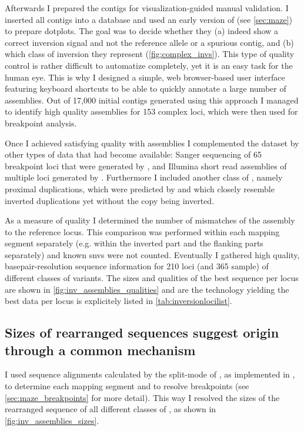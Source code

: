 Afterwards I prepared the contigs for visualization-guided manual validation. I
inserted all contigs into a database and used an early version of \maze (see
\cref{sec:maze}) to prepare dotplots. The goal was to decide whether they (a)
indeed show a correct inversion signal and not the reference allele or a
spurious contig, and (b) which class of inversion they represent
(\cref{fig:complex_invs}). This type of quality control is rather difficult to
automatize completely, yet it is an easy task for the human eye. This is why I
designed a simple, web browser-based user interface featuring keyboard shortcuts
to be able to quickly annotate a large number of assemblies. Out of 17,000
initial contigs generated using this approach I managed to identify high quality
assemblies for 153 complex loci, which were then used for breakpoint analysis.

Once I achieved satisfying quality with \pacbio assemblies I complemented the
dataset by other types of data that had become available: Sanger sequencing of
65 breakpoint loci that were generated by \adrian, and Illumina short read
assemblies of multiple loci generated by \tobias. Furthermore I included another
class of \sv, namely proximal duplications, which were predicted by \tobias and
which closely resemble inverted duplications yet without the copy being
inverted.

As a measure of quality I determined the number of mismatches of the assembly to
the reference locus. This comparison was performed within each mapping segment
separately (e.g. within the inverted part and the flanking parts separately) and
known \acp{snv} were not counted. Eventually I gathered high quality,
basepair-resolution sequence information for 210 loci (and 365 sample) of
different classes of variants. The sizes and qualities of the best sequence per
locus are shown in \cref{fig:inv_assemblies_qualities} and are the technology
yielding the best data per locus is explicitely listed in
\cref{tab:inversionlocilist}.




\subsection{Sizes of rearranged sequences suggest origin through a common mechanism}
\label{sec:size_of_assemblies}

I used sequence alignments calculated by the split-mode of \last, as implemented
in \maze, to determine each mapping segment and to resolve breakpoints (see
\cref{sec:maze_breakpoints} for more detail). This way I resolved the sizes of
the rearranged sequence of all different classes of \sv, as shown in
\cref{fig:inv_assemblies_sizes}.

